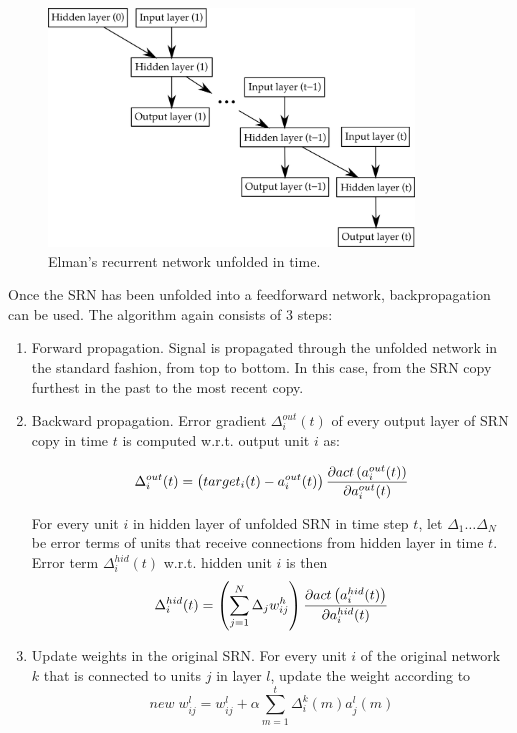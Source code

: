 \documentclass[12pt,oneside]{fithesis2}
\begin{document}
	\begin{figure}[ht]
		\centering
		\includegraphics[width=367px]{bptt2.png}
		\caption{Elman's recurrent network unfolded in time. }
		\label{fig:bptt}
	\end{figure}

Once the SRN has been unfolded into a feedforward network, backpropagation can be used. The algorithm again consists of 3 steps:
\begin{enumerate}
  \item Forward propagation. Signal is propagated through the unfolded network in the standard fashion, from top to bottom. In this case, from the SRN copy furthest in the past to the most recent copy.
  \item Backward propagation. Error gradient $\Delta^{out}_{i}(t)$ of every output layer of SRN copy in time $t$ is computed w.r.t. output unit $i$ as:
 
  $$\Delta^{out}_{i}(t) = \left(target_{i}(t) - a^{out}_{i}(t)\right) {{\partial{act\left(a^{out}_{i}(t)\right)}} \over {\partial a^{out}_{i}(t)}}$$
 
 
  For every unit $i$ in hidden layer of unfolded SRN in time step $t$, let $\Delta_1 \dots \Delta_N$ be error terms of units that receive connections from hidden layer in time $t$. Error term $\Delta^{hid}_{i}(t)$ w.r.t. hidden unit $i$ is then
  $$\Delta^{hid}_{i}(t) =\left(\sum\limits_{j=1}^{N} \Delta_{j}w_{ij}^{h}\right) {{\partial{act\left(a^{hid}_{i}(t)\right)}} \over {\partial a^{hid}_{i}(t)}}$$
  
  \item Update weights in the original SRN. For every unit $i$ of the original network $k$ that is connected to units $j$ in layer $l$, update the weight according to
  $$new \; w_{ij}^l = w_{ij}^l + \alpha \sum\limits_{m=1}^{t} \Delta_i^{k}\left(m\right) a_{j}^{l}\left(m\right)$$

\end{enumerate}
\end{document}
